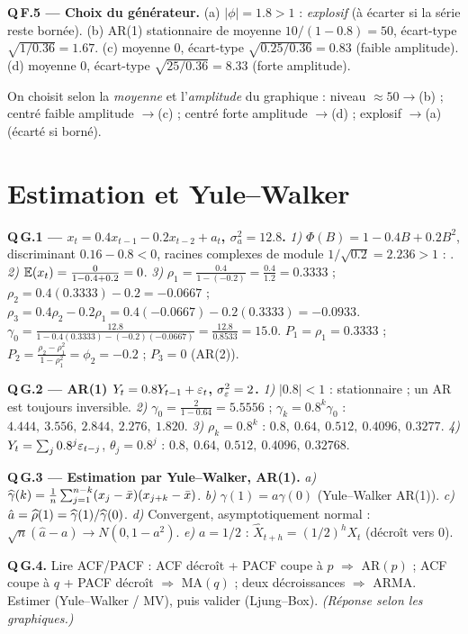 \documentclass[11pt]{article}
\begin{document}
\textbf{Q\,F.5 --- Choix du générateur.}
(a) $|\phi|=1.8>1$ : \emph{explosif} (à écarter si la série reste bornée).
(b) AR(1) stationnaire de moyenne $10/(1-0.8)=50$, écart-type $\sqrt{1/0.36}=1.67$.
(c) moyenne $0$, écart-type $\sqrt{0.25/0.36}=0.83$ (faible amplitude).
(d) moyenne $0$, écart-type $\sqrt{25/0.36}=8.33$ (forte amplitude).
\begin{reponse}On choisit selon la \emph{moyenne} et l'\emph{amplitude} du graphique : niveau
$\approx50\to$(b) ; centré faible amplitude $\to$(c) ; centré forte amplitude $\to$(d) ;
explosif $\to$(a) (écarté si borné).\end{reponse}

\section{Estimation et Yule--Walker}

\textbf{Q\,G.1 --- $x_t=0.4x_{t-1}-0.2x_{t-2}+a_t$, $\sigma_a^2=12.8$.}
\emph{1)} $\Phi(B)=1-0.4B+0.2B^2$, discriminant $0.16-0.8<0$, racines complexes de module
$1/\sqrt{0.2}=2.236>1$ : .
\emph{2)} $\mathbb{E}(x_t)=\frac{0}{1-0.4+0.2}=0$.
\emph{3)} $\rho_1=\frac{0.4}{1-(-0.2)}=\frac{0.4}{1.2}=0.3333$ ;
$\rho_2=0.4(0.3333)-0.2=-0.0667$ ; $\rho_3=0.4\rho_2-0.2\rho_1=0.4(-0.0667)-0.2(0.3333)=-0.0933$.
$\gamma_0=\frac{12.8}{1-0.4(0.3333)-(-0.2)(-0.0667)}=\frac{12.8}{0.8533}=15.0$.
$P_1=\rho_1=0.3333$ ; $P_2=\frac{\rho_2-\rho_1^2}{1-\rho_1^2}=\phi_2=-0.2$ ; $P_3=0$ (AR(2)).

\textbf{Q\,G.2 --- AR(1) $Y_t=0.8Y_{t-1}+\varepsilon_t$, $\sigma_\varepsilon^2=2$.}
\emph{1)} $|0.8|<1$ : stationnaire ; un AR est toujours inversible.
\emph{2)} $\gamma_0=\frac{2}{1-0.64}=5.5556$ ; $\gamma_k=0.8^k\gamma_0$ :
$4.444,\ 3.556,\ 2.844,\ 2.276,\ 1.820$.
\emph{3)} $\rho_k=0.8^k$ : $0.8,\ 0.64,\ 0.512,\ 0.4096,\ 0.3277$.
\emph{4)} $Y_t=\sum_j0.8^j\varepsilon_{t-j}$, $\theta_j=0.8^j$ :
$0.8,\ 0.64,\ 0.512,\ 0.4096,\ 0.32768$.

\textbf{Q\,G.3 --- Estimation par Yule--Walker, AR(1).}
\emph{a)} $\widehat{\gamma}(k)=\frac1n\sum_{j=1}^{n-k}(x_j-\bar x)(x_{j+k}-\bar x)$.
\emph{b)} $\gamma(1)=a\gamma(0)$ (Yule--Walker AR(1)).
\emph{c)} $\hat a=\widehat{\rho}(1)=\widehat{\gamma}(1)/\widehat{\gamma}(0)$.
\emph{d)} Convergent, asymptotiquement normal : $\sqrt n(\hat a-a)\to N(0,1-a^2)$.
\emph{e)} $a=1/2$ : $\widehat X_{t+h}=(1/2)^hX_t$ (décroît vers $0$).

\textbf{Q\,G.4.} Lire ACF/PACF : ACF décroît + PACF coupe à $p$ $\Rightarrow$ AR$(p)$ ;
ACF coupe à $q$ + PACF décroît $\Rightarrow$ MA$(q)$ ; deux décroissances $\Rightarrow$ ARMA.
Estimer (Yule--Walker / MV), puis valider (Ljung--Box). \emph{(Réponse selon les graphiques.)}
\end{document}
